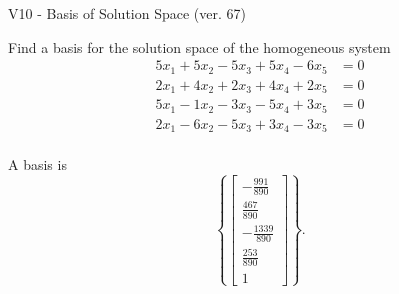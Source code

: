 \begin{exercise}
  \begin{exerciseTitle}V10 - Basis of Solution Space (ver. 67)\end{exerciseTitle}
  \begin{exerciseStatement}
    Find a basis for the solution space of the homogeneous system 
\begin{align*}
 5 x_ 1 + 5 x_ 2 -5 x_ 3 + 5 x_ 4 -6 x_ 5 &= 0  \\ 
  2 x_ 1 + 4 x_ 2 + 2 x_ 3 + 4 x_ 4 + 2 x_ 5 &= 0  \\ 
  5 x_ 1 -1 x_ 2 -3 x_ 3 -5 x_ 4 + 3 x_ 5 &= 0  \\ 
  2 x_ 1 -6 x_ 2 -5 x_ 3 + 3 x_ 4 -3 x_ 5 &= 0  \\ 
 \end{align*}


 
  \end{exerciseStatement}

  \begin{exerciseAnswer}
   A basis is   
\[\left\{\left[\begin{array}{c}
-\frac{991}{890} \\
\frac{467}{890} \\
-\frac{1339}{890} \\
\frac{253}{890} \\
1
\end{array}\right]\right\}.\]

  


  \end{exerciseAnswer}
\end{exercise}